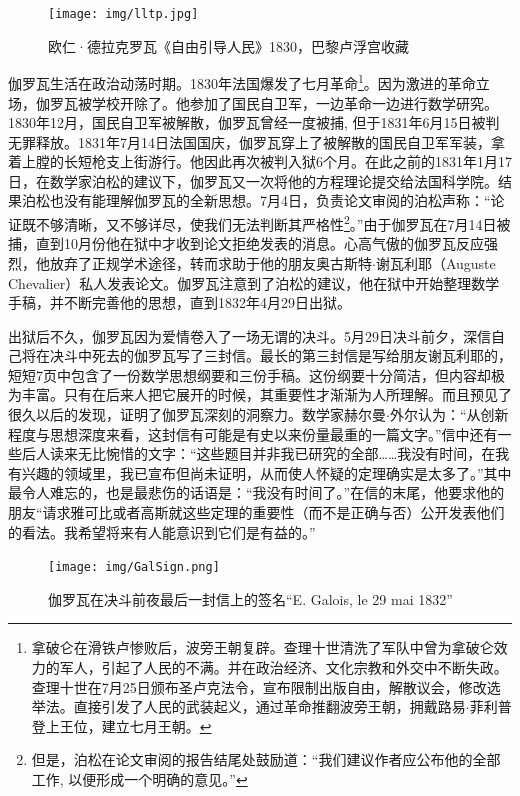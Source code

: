 \documentclass[b5paper]{ctexart}
\begin{document}
\begin{figure}[htbp]
 \centering
 \texttt{[image: img/lltp.jpg]}
 \captionsetup{labelformat=empty}
 \caption{欧仁·德拉克罗瓦《自由引导人民》1830，巴黎卢浮宫收藏}
 \label{fig:Liberty-Leading-the-People}
\end{figure}

伽罗瓦生活在政治动荡时期。1830年法国爆发了七月革命\footnote{拿破仑在滑铁卢惨败后，波旁王朝复辟。查理十世清洗了军队中曾为拿破仑效力的军人，引起了人民的不满。并在政治经济、文化宗教和外交中不断失政。查理十世在7月25日颁布圣卢克法令，宣布限制出版自由，解散议会，修改选举法。直接引发了人民的武装起义，通过革命推翻波旁王朝，拥戴路易$\cdot$菲利普登上王位，建立七月王朝。}。因为激进的革命立场，伽罗瓦被学校开除了。他参加了国民自卫军，一边革命一边进行数学研究。1830年12月，国民自卫军被解散，伽罗瓦曾经一度被捕, 但于1831年6月15日被判无罪释放。1831年7月14日法国国庆，伽罗瓦穿上了被解散的国民自卫军军装，拿着上膛的长短枪支上街游行。他因此再次被判入狱6个月。在此之前的1831年1月17日，在数学家泊松的建议下，伽罗瓦又一次将他的方程理论提交给法国科学院。结果泊松也没有能理解伽罗瓦的全新思想。7月4日，负责论文审阅的泊松声称：“论证既不够清晰，又不够详尽，使我们无法判断其严格性\footnote{但是，泊松在论文审阅的报告结尾处鼓励道：“我们建议作者应公布他的全部工作, 以便形成一个明确的意见。”}。”由于伽罗瓦在7月14日被捕，直到10月份他在狱中才收到论文拒绝发表的消息。心高气傲的伽罗瓦反应强烈，他放弃了正规学术途径，转而求助于他的朋友奥古斯特$\cdot$谢瓦利耶（Auguste Chevalier）私人发表论文。伽罗瓦注意到了泊松的建议，他在狱中开始整理数学手稿，并不断完善他的思想，直到1832年4月29日出狱。

出狱后不久，伽罗瓦因为爱情卷入了一场无谓的决斗。5月29日决斗前夕，深信自己将在决斗中死去的伽罗瓦写了三封信。最长的第三封信是写给朋友谢瓦利耶的，短短7页中包含了一份数学思想纲要和三份手稿。这份纲要十分简洁，但内容却极为丰富。只有在后来人把它展开的时候，其重要性才渐渐为人所理解。而且预见了很久以后的发现，证明了伽罗瓦深刻的洞察力。数学家赫尔曼$\cdot$外尔认为：“从创新程度与思想深度来看，这封信有可能是有史以来份量最重的一篇文字。”信中还有一些后人读来无比惋惜的文字：“这些题目并非我已研究的全部……我没有时间，在我有兴趣的领域里，我已宣布但尚未证明，从而使人怀疑的定理确实是太多了。”其中最令人难忘的，也是最悲伤的话语是：“我没有时间了。”在信的末尾，他要求他的朋友“请求雅可比或者高斯就这些定理的重要性（而不是正确与否）公开发表他们的看法。我希望将来有人能意识到它们是有益的。”

\begin{figure}[htbp]
 \centering
 \texttt{[image: img/GalSign.png]}
 \captionsetup{labelformat=empty}
 \caption{伽罗瓦在决斗前夜最后一封信上的签名``E. Galois, le 29 mai 1832''}
 \label{fig:GalSign}
\end{figure}
\end{document}
